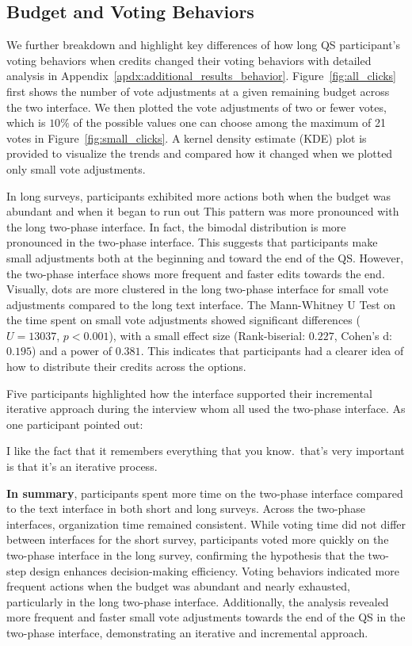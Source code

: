 \subsection{Budget and Voting Behaviors}
We further breakdown and highlight key differences of how long QS participant's voting behaviors when credits changed their voting behaviors with detailed analysis in Appendix~\ref{apdx:additional_results_behavior}. Figure~\ref{fig:all_clicks} first shows the number of vote adjustments at a given remaining budget across the two interface. We then plotted the vote adjustments of two or fewer votes, which is $10\%$ of the possible values one can choose among the maximum of 21 votes in Figure~\ref{fig:small_clicks}. A kernel density estimate (KDE) plot is provided to visualize the trends and compared how it changed when we plotted only small vote adjustments.

In long surveys, participants exhibited more actions both when the budget was abundant and when it began to run out This pattern was more pronounced with the long two-phase interface. In fact, the bimodal distribution is more pronounced in the two-phase interface. This suggests that participants make small adjustments both at the beginning and toward the end of the QS. However, the two-phase interface shows more frequent and faster edits towards the end. Visually, dots are more clustered in the long two-phase interface for small vote adjustments compared to the long text interface. The Mann-Whitney U Test on the time spent on small vote adjustments showed significant differences ($U=13037$, $p<0.001$), with a small effect size (Rank-biserial: $0.227$, Cohen's d: $0.195$) and a power of $0.381$. This indicates that participants had a clearer idea of how to distribute their credits across the options.

Five participants highlighted how the interface supported their incremental iterative approach during the interview whom all used the two-phase interface. As one participant pointed out:

\begin{displayquote}
I like the fact that it remembers everything that you know.~\bracketellipsis that's very important is that it's an iterative process.\hfill{}
\end{displayquote}

\textbf{In summary}, participants spent more time on the two-phase interface compared to the text interface in both short and long surveys. Across the two-phase interfaces, organization time remained consistent. While voting time did not differ between interfaces for the short survey, participants voted more quickly on the two-phase interface in the long survey, confirming the hypothesis that the two-step design enhances decision-making efficiency. Voting behaviors indicated more frequent actions when the budget was abundant and nearly exhausted, particularly in the long two-phase interface. Additionally, the analysis revealed more frequent and faster small vote adjustments towards the end of the QS in the two-phase interface, demonstrating an iterative and incremental approach. 

